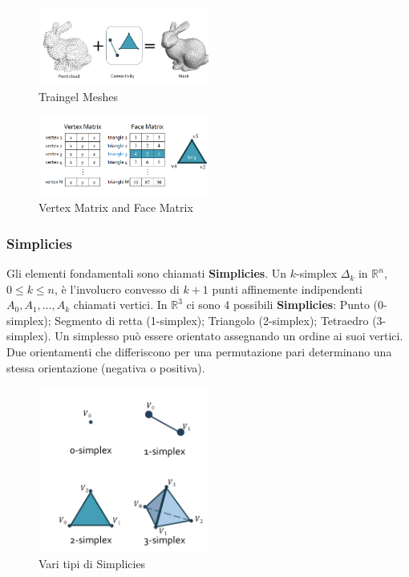 \begin{figure}[H]
    \centering
    \includegraphics[width=0.5\textwidth]{images/TraingleMeshes.png} 
    \caption{Traingel Meshes}
    \label{fig:immagine}
\end{figure}
\begin{figure}[H]
    \centering
    \includegraphics[width=0.5\textwidth]{images/Matricies.png} 
    \caption{Vertex Matrix and Face Matrix}
    \label{fig:immagine}
\end{figure}
\subsubsection{Simplicies}
Gli elementi fondamentali sono chiamati \textbf{Simplicies}.
Un $k$-simplex $\Delta_k$ in $\mathbb{R}^n$, $0 \leq k \leq n$, è l'involucro convesso di $k+1$ punti affinemente indipendenti $A_0, A_1, \dots, A_k$ chiamati vertici.
In $\mathbb{R}^3$ ci sono 4 possibili \textbf{Simplicies}: Punto (0-simplex); Segmento di retta (1-simplex); Triangolo (2-simplex); Tetraedro (3-simplex).
Un simplesso può essere orientato assegnando un ordine ai suoi vertici. Due orientamenti che differiscono per una permutazione pari determinano una stessa orientazione (negativa o positiva).
\begin{figure}[H]
    \centering
    \includegraphics[width=0.5\textwidth]{images/Simplex.png} 
    \caption{Vari tipi di Simplicies}
    \label{fig:immagine}
\end{figure}
